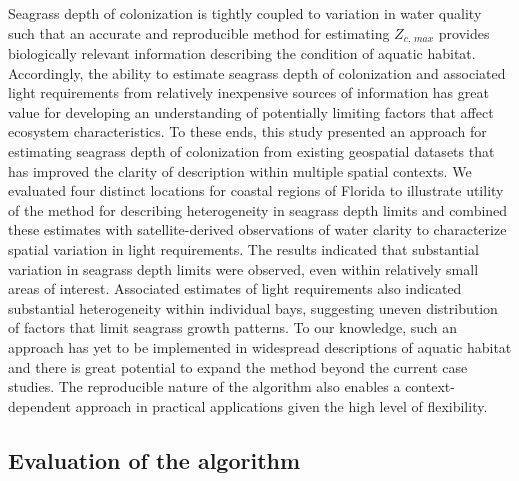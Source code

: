 \documentclass[letterpaper,12pt,oneside]{article}\usepackage[]{graphicx}\usepackage[]{color}
\begin{document}
Seagrass depth of colonization is tightly coupled to variation in water quality such that an accurate and reproducible method for estimating $Z_{c,\,max}$ provides biologically relevant information describing the condition of aquatic habitat.  Accordingly, the ability to estimate seagrass depth of colonization and associated light requirements from relatively inexpensive sources of information has great value for developing an understanding of potentially limiting factors that affect ecosystem characteristics.  To these ends, this study presented an approach for estimating seagrass depth of colonization from existing geospatial datasets that has improved the clarity of description within multiple spatial contexts.  We evaluated four distinct locations for coastal regions of Florida to illustrate utility of the method for describing heterogeneity in seagrass depth limits and combined these estimates with satellite-derived observations of water clarity to characterize spatial variation in light requirements.  The results indicated that substantial variation in seagrass depth limits were observed, even within relatively small areas of interest.  Associated estimates of light requirements also indicated substantial heterogeneity within individual bays, suggesting uneven distribution of factors that limit seagrass growth patterns.  To our knowledge, such an approach has yet to be implemented in widespread descriptions of aquatic habitat and there is great potential to expand the method beyond the current case studies.  The reproducible nature of the algorithm also enables a context-dependent approach in practical applications given the high level of flexibility.

\subsection{Evaluation of the algorithm}
\end{document}
